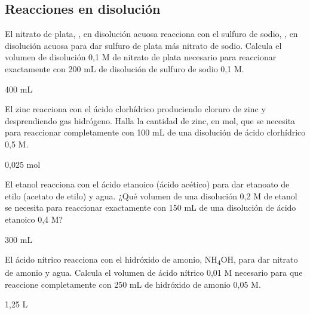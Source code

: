\documentclass[
]{article}
\begin{document}
\hypertarget{reacciones-en-disoluciuxf3n}{%
\subsection{Reacciones en
disolución}\label{reacciones-en-disoluciuxf3n}}

\begin{exercise}[tags=OXF16] El nitrato de plata, , en
disolución acuosa reacciona con el sulfuro de sodio, , en
disolución acuosa para dar sulfuro de plata más nitrato de sodio.
Calcula el volumen de disolución 0,1 M de nitrato de plata necesario
para reaccionar exactamente con 200 mL de disolución de sulfuro de sodio
0,1 M.\end{exercise}

\begin{solution}400 mL\end{solution}

\begin{exercise}[tags=OXF16] El zinc reacciona con el ácido clorhídrico
produciendo cloruro de zinc y desprendiendo gas hidrógeno. Halla la
cantidad de zinc, en mol, que se necesita para reaccionar completamente
con 100 mL de una disolución de ácido clorhídrico 0,5 M.\end{exercise}

\begin{solution}0,025 mol\end{solution}

\begin{exercise}[tags=OXF16] El etanol reacciona con el ácido etanoico
(ácido acético) para dar etanoato de etilo (acetato de etilo) y agua.
¿Qué volumen de una disolución 0,2 M de etanol se necesita para
reaccionar exactamente con 150 mL de una disolución de ácido etanoico
0,4 M?\end{exercise}

\begin{solution}300 mL\end{solution}

\begin{exercise}[tags=OXF16] El ácido nítrico reacciona con el hidróxido
de amonio, NH\textsubscript{4}OH, para dar nitrato de amonio y agua.
Calcula el volumen de ácido nítrico 0,01 M necesario para que reaccione
completamente con 250 mL de hidróxido de amonio 0,05 M.\end{exercise}

\begin{solution}1,25 L\end{solution}
\end{document}

